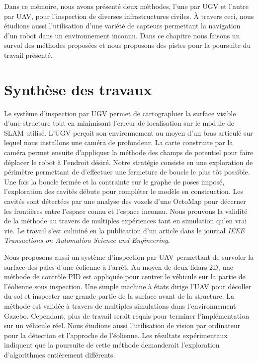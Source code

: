 \label{sec:Conclusion}

Dans ce mémoire, nous avons présenté deux méthodes, l'une par UGV et l'autre par UAV, pour l'inspection de diverses infrastructures civiles. À travers ceci, nous étudions aussi l'utilisation d'une variété de capteurs permettant la navigation d'un robot dans un environnement inconnu. Dans ce chapitre nous faisons un survol des méthodes proposées et nous proposons des pistes pour la poursuite du travail présenté.

\section{Synthèse des travaux}

Le système d'inspection par UGV permet de cartographier la surface visible d'une structure tout en minimisant l'erreur de localisation sur le module de SLAM utilisé. L'UGV perçoit son environnement au moyen d'un bras articulé sur lequel nous installons une caméra de profondeur. La carte construite par la caméra permet ensuite d'appliquer la méthode des champs de potentiel pour faire déplacer le robot à l'endroit désiré. Notre stratégie consiste en une exploration de périmètre permettant de d'effectuer une fermeture de boucle le plus tôt possible. Une fois la boucle fermée et la contrainte sur le graphe de poses imposé, l'exploration des cavités débute pour compléter le modèle en construction. Les cavités sont détectées par une analyse des voxels d'une OctoMap pour décerner les frontières entre l'espace connu et l'espace inconnu. Nous prouvons la validité de la méthode au travers de multiples expériences tant en simulation qu'en vrai vie. Le travail s'est culminé en la publication d'un article dans le journal \emph{IEEE Transactions on Automation Science and Engineering}.

Nous proposons aussi un système d'inspection par UAV permettant de survoler la surface des pales d'une éolienne à l'arrêt. Au moyen de deux lidars 2D, une méthode de contrôle PID est appliquée pour centrer le véhicule sur la partie de l'éolienne sous inspection. Une simple machine à états dirige l'UAV pour décoller du sol et inspecter une grande partie de la surface avant de la structure. La méthode est validée à travers de multiples simulations dans l'environnement Gazebo. Cependant, plus de travail serait requis pour terminer l'implémentation sur un véhicule réel. Nous étudions aussi l'utilisation de vision par ordinateur pour la détection et l'approche de l'éolienne. Les résultats expérimentaux indiquent que la poursuite de cette méthode demanderait l'exploration d'algorithmes entièrement différents.

